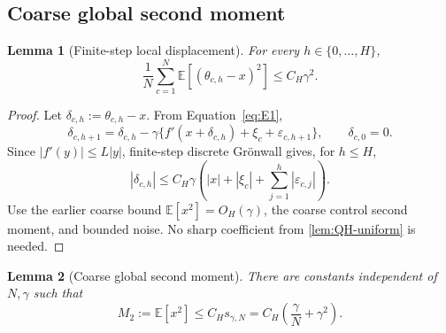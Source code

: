 \documentclass[11pt]{article}
\newtheorem{lemma}[lemma]{Lemma}
\theoremstyle{definition}
\newcommand{\E}{\mathbb{E}}
\newcommand{\smallscale}{s_{\gamma,N}}
\newcommand{\eps}{\varepsilon}
\newcommand{\delt}{\delta}
\begin{document}
\subsection{Coarse global second moment}

\begin{lemma}[Finite-step local displacement]
\label{lem:displacement2}
For every $h\in\{0,\ldots,H\}$,
\begin{equation}
\label{eq:disp2}
  \frac1N\sum_{c=1}^N\E[(\theta_{c,h}-x)^2]\le C_H\gamma^2.
\end{equation}
\end{lemma}

\begin{proof}
Let $\delt_{c,h}:=\theta_{c,h}-x$. From Equation~\eqref{eq:E1},
\[
  \delt_{c,h+1}=\delt_{c,h}-\gamma\{f'(x+\delt_{c,h})+\xi_c+\eps_{c,h+1}\},
  \qquad \delt_{c,0}=0.
\]
Since $|f'(y)|\le L|y|$, finite-step discrete Gr\"onwall gives, for $h\le H$,
\[
  |\delt_{c,h}|\le C_H\gamma\left(|x|+|\xi_c|+\sum_{j=1}^h|\eps_{c,j}|\right).
\]
Use the earlier coarse bound $\E[x^2]=O_H(\gamma)$, the coarse control second moment, and bounded noise. No sharp coefficient from \cref{lem:QH-uniform} is needed.
\end{proof}

\begin{lemma}[Coarse global second moment]
\label{lem:G5a}
There are constants independent of $N,\gamma$ such that
\begin{equation}
\label{eq:G5a}
  M_2:=\E[x^2]\le C_H\smallscale
  =C_H\left(\frac{\gamma}{N}+\gamma^2\right).
\end{equation}
\end{lemma}
\end{document}
